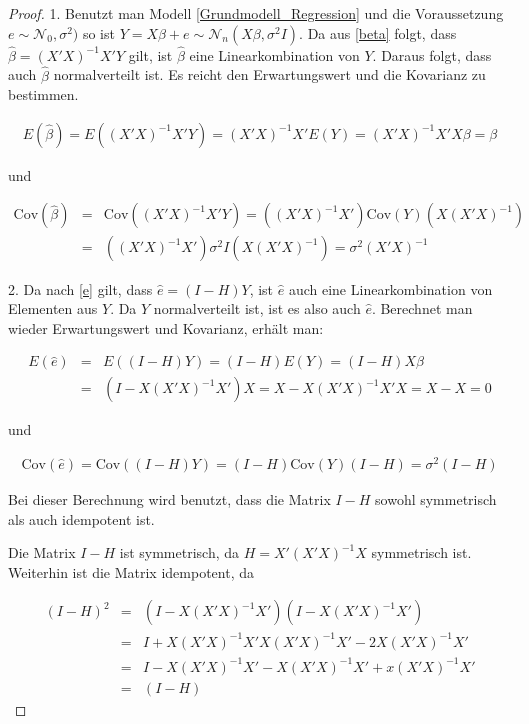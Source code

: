 \documentclass[12pt,a4paper]{article}
\theoremstyle{definition}
\theoremstyle{definition}
\theoremstyle{definition}
\begin{document}
\begin{proof}
1. 
Benutzt man Modell \eqref{Grundmodell_Regression} und die Voraussetzung $ e \sim \mathscr{N}_0,\sigma^2)$ so ist $Y=X \beta + e \sim \mathscr{N}_{n}(X\beta,\sigma^2 I)$. Da aus \eqref{beta} folgt, dass $\hat{\beta} = (X'X)^{-1} X' Y$ gilt, ist $\hat{\beta}$ eine Linearkombination von $Y$. Daraus folgt, dass auch $\hat{\beta}$ normalverteilt ist. Es reicht den Erwartungswert und die Kovarianz zu bestimmen. 

\begin{align*}
E(\hat{\beta}) = E((X'X)^{-1}X'Y) = (X'X)^{-1} X' E(Y) = (X'X)^{-1} X'X \beta = \beta
\end{align*}

und

\begin{eqnarray*}
\text{Cov}(\hat{\beta}) &=& \text{Cov}((X'X)^{-1} X' Y) = ((X'X)^{-1}X') \text{Cov}(Y) (X(X'X)^{-1}) \\
&=& ((X'X)^{-1}X') \sigma^2 I (X(X'X)^{-1}) = \sigma^2 (X'X)^{-1}
\end{eqnarray*}


2.
Da nach \eqref{e} gilt, dass $\hat{e}=(I-H)Y$, ist $\hat{e}$ auch eine Linearkombination von Elementen aus $Y$. Da $Y$ normalverteilt ist, ist es also auch $\hat{e}$. Berechnet man wieder Erwartungswert und Kovarianz, erhält man:

\begin{eqnarray*}
E(\hat{e}) &=& E((I-H)Y) = (I-H)E(Y) = (I-H)X\beta \\ 
&=& (I-X(X'X)^{-1}X')X = X-X(X'X)^{-1}X'X = X-X = 0
\end{eqnarray*}

und

\begin{align*}
\text{Cov}(\hat{e}) = \text{Cov}((I-H)Y) = (I-H) \text{Cov}(Y) (I-H) = \sigma^2 (I-H)
\end{align*}

Bei dieser Berechnung wird benutzt, dass die Matrix $I-H$ sowohl symmetrisch als auch idempotent ist. 

Die Matrix $I-H$ ist symmetrisch, da $H=X'(X'X)^{-1}X$ symmetrisch ist. Weiterhin ist die Matrix idempotent, da

\begin{eqnarray*}
(I-H)^2 &=& (I-X(X'X)^{-1}X')(I-X(X'X)^{-1}X') \\
&=& I + X(X'X)^{-1} X'X(X'X)^{-1}X' - 2 X(X'X)^{-1}X' \\
&=& I - X(X'X)^{-1}X' - X(X'X)^{-1}X'+ x(X'X)^{-1}X' \\
&=& (I-H)
\end{eqnarray*}


\end{proof}
\end{document}
